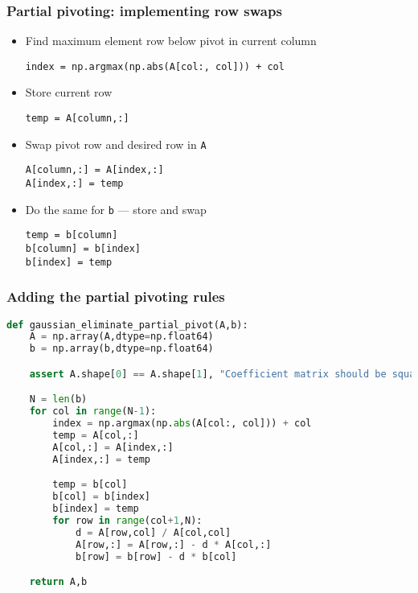 \begin{frame}[fragile]
  \frametitle{Partial pivoting: implementing row swaps}
  \begin{itemize}[<+->]
    \item Find maximum element row below pivot in current column
    \begin{lstlisting}[numbers=none]
index = np.argmax(np.abs(A[col:, col])) + col 
    \end{lstlisting}
    \item Store current row
    \begin{lstlisting}[numbers=none]
temp = A[column,:]
    \end{lstlisting}
    \item Swap pivot row and desired row in \lstinline$A$
    \begin{lstlisting}[numbers=none]
A[column,:] = A[index,:]
A[index,:] = temp
      \end{lstlisting}
    \item Do the same for \lstinline$b$ --- store and swap
    \begin{lstlisting}[numbers=none]
temp = b[column]
b[column] = b[index]
b[index] = temp
      \end{lstlisting}
  \end{itemize}
\end{frame}

\begin{frame}[fragile]
  \frametitle{Adding the partial pivoting rules}
  \begin{lstlisting}[language=Python]
def gaussian_eliminate_partial_pivot(A,b):
    A = np.array(A,dtype=np.float64)
    b = np.array(b,dtype=np.float64)

    assert A.shape[0] == A.shape[1], "Coefficient matrix should be square"

    N = len(b)
    for col in range(N-1):
        index = np.argmax(np.abs(A[col:, col])) + col
        temp = A[col,:]
        A[col,:] = A[index,:]
        A[index,:] = temp

        temp = b[col]
        b[col] = b[index]
        b[index] = temp
        for row in range(col+1,N):
            d = A[row,col] / A[col,col]
            A[row,:] = A[row,:] - d * A[col,:]
            b[row] = b[row] - d * b[col]

    return A,b
  \end{lstlisting}
\end{frame}


